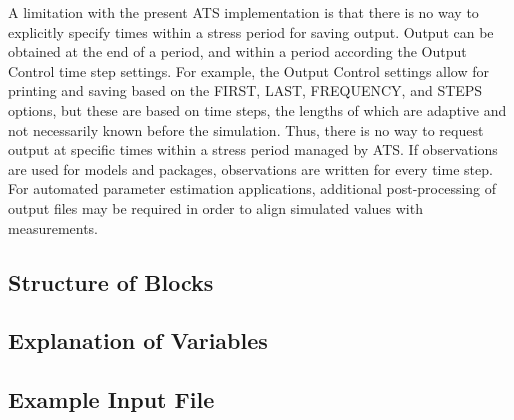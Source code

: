 A limitation with the present ATS implementation is that there is no way to explicitly specify times within a stress period for saving output.  Output can be obtained at the end of a period, and within a period according the Output Control time step settings.  For example, the Output Control settings allow for printing and saving based on the FIRST, LAST, FREQUENCY, and STEPS options, but these are based on time steps, the lengths of which are adaptive and not necessarily known before the simulation.  Thus, there is no way to request output at specific times within a stress period managed by ATS.  If observations are used for models and packages, observations are written for every time step.  For automated parameter estimation applications, additional post-processing of output files may be required in order to align simulated values with measurements.  

\vspace{5mm}
\subsection{Structure of Blocks}
%



\vspace{5mm}
\subsection{Explanation of Variables}
\begin{description}

\end{description}

\vspace{5mm}
\subsection{Example Input File}


